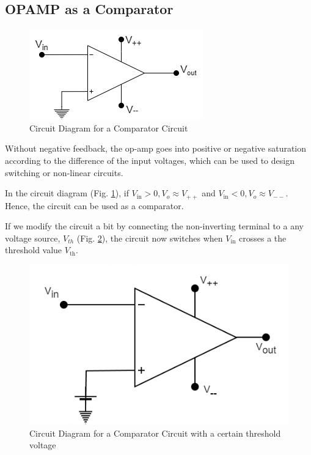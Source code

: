 \subsection{OPAMP as a Comparator}

\begin{figure}[H]
    \centering
    \includegraphics[width=0.8\columnwidth]{images/comparator.jpg}
    \caption{Circuit Diagram for a Comparator Circuit}
    \label{comp1}
\end{figure}

Without negative feedback, the op-amp goes into positive or negative saturation according to the difference of the input voltages, which can be used to design switching or non-linear circuits.

In the circuit diagram (Fig. \ref{comp1}), if $V_\text{in} > 0, V_o \approx V_{++}$ and $V_\text{in} < 0, V_o \approx V_{--}$. Hence, the circuit can be used as a comparator.

If we modify the circuit a bit by connecting the non-inverting terminal to a any voltage source, $V_{th}$ (Fig. \ref{comp2}), the circuit now switches when $V_\text{in}$ crosses a the threshold value $V_\text{th}$.

\begin{figure}[H]
    \centering
    \includegraphics[width=0.8\columnwidth]{images/comp2.png}
    \caption{Circuit Diagram for a Comparator Circuit with a certain threshold voltage}
    \label{comp2}
\end{figure}

